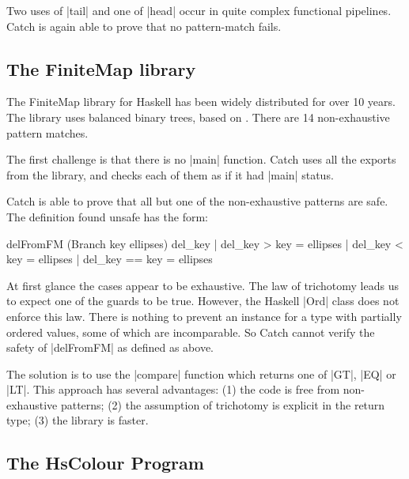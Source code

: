 \noindent Two uses of |tail| and one of |head| occur in quite complex functional pipelines. Catch is again able to prove that no pattern-match fails.

\subsection{The FiniteMap library}
\label{secC:finitemap}

The FiniteMap library for Haskell has been widely distributed for over 10 years. The library uses balanced binary trees, based on \cite{adams:sets}. There are 14 non-exhaustive pattern matches.

The first challenge is that there is no |main| function. Catch uses all the exports from the library, and checks each of them as if it had |main| status.

Catch is able to prove that all but one of the non-exhaustive patterns are safe. The definition found unsafe has the form:

\begin{comment}
\begin{code}
data Branch a b = Branch a b
\end{code}
\end{comment}

\begin{code}
delFromFM (Branch key ellipses) del_key  | del_key  >   key = ellipses
                                         | del_key  <   key = ellipses
                                         | del_key  ==  key = ellipses
\end{code}

At first glance the cases appear to be exhaustive. The law of trichotomy leads us to expect one of the guards to be true. However, the Haskell |Ord| class does not enforce this law. There is nothing to prevent an instance for a type with partially ordered values, some of which are incomparable. So Catch cannot verify the safety of |delFromFM| as defined as above.

The solution is to use the |compare| function which returns one of |GT|, |EQ| or |LT|. This approach has several advantages: (1) the code is free from non-exhaustive patterns; (2) the assumption of trichotomy is explicit in the return type; (3) the library is faster.


\subsection{The HsColour Program}
\label{secC:hscolour}

